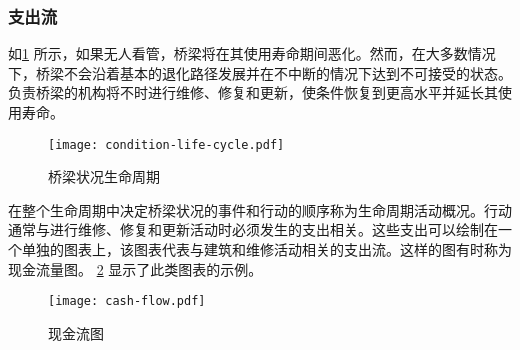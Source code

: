 \subsubsection{支出流}
如\cref{fig:bridge-condition-life-cycle} 所示，如果无人看管，桥梁将在其使用寿命期间恶化。然而，在大多数情况下，桥梁不会沿着基本的退化路径发展并在不中断的情况下达到不可接受的状态。负责桥梁的机构将不时进行维修、修复和更新，使条件恢复到更高水平并延长其使用寿命。

\begin{figure}
  \texttt{[image: condition-life-cycle.pdf]}
  \caption{桥梁状况生命周期}
  \label{fig:bridge-condition-life-cycle}
\end{figure}

在整个生命周期中决定桥梁状况的事件和行动的顺序称为生命周期活动概况。行动通常与进行维修、修复和更新活动时必须发生的支出相关。这些支出可以绘制在一个单独的图表上，该图表代表与建筑和维修活动相关的支出流。这样的图有时称为现金流量图。 \cref{fig:cash-flow-diagram} 显示了此类图表的示例。

\begin{figure}
  \texttt{[image: cash-flow.pdf]}
  \caption{现金流图}
  \label{fig:cash-flow-diagram}
\end{figure}

